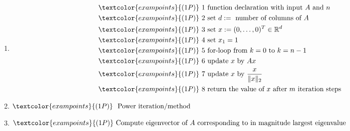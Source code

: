 {\color{solution}
\begin{enumerate} \footnotesize
	\item 
	\begin{align*}
	\textcolor{exampoints}{\left(1P\right)}~&1~ \text{function declaration with input}~ A~\text{and}~n\\
	\textcolor{exampoints}{\left(1P\right)}~&2~\text{set}~d:=~\text{number of columns of}~A\\
	\textcolor{exampoints}{\left(1P\right)}~&3~\text{set}~x:=(0,\dots,0)^T\in\mathbb{R}^d\\
	\textcolor{exampoints}{\left(1P\right)}~&4~\text{set}~x_1=1\\
	\textcolor{exampoints}{\left(1P\right)}~&5~\text{for-loop from}~k=0~\text{to}~k=n-1\\
	\textcolor{exampoints}{\left(1P\right)}~&6~\text{update}~x~\text{by}~Ax\\
	\textcolor{exampoints}{\left(1P\right)}~&7~\text{update}~x~\text{by}~\frac{x}{\|x\|_2}\\
	\textcolor{exampoints}{\left(1P\right)}~&8~\text{return the value of}~x~\text{after}~m~\text{iteration steps}
	\end{align*}
	\item $\textcolor{exampoints}{(1P)}~\text{ Power iteration/method}$
	\item $	\textcolor{exampoints}{(1P)}~ \text{Compute eigenvector of}~A~\text{corresponding to in magnitude largest eigenvalue}$
\end{enumerate}
}